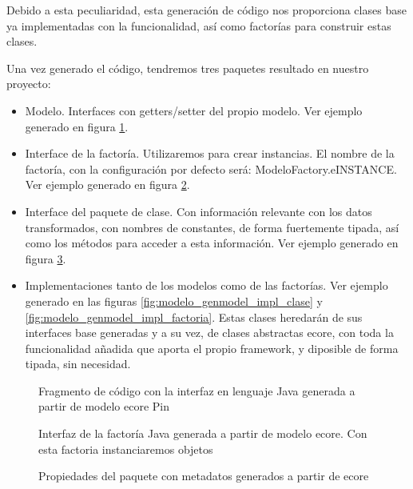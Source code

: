 Debido a esta peculiaridad, esta generación de código nos proporciona clases base ya implementadas con la funcionalidad, así como factorías para construir estas clases.

Una vez generado el código, tendremos tres paquetes resultado en nuestro proyecto:

\begin{itemize}

\item Modelo. Interfaces con getters/setter del propio modelo. Ver ejemplo generado en figura \ref{fig:modelo_genmodel_gen_interface}.

\item Interface de la factoría. Utilizaremos para crear instancias. El nombre de la factoría, con la configuración por defecto será: ModeloFactory.eINSTANCE. Ver ejemplo generado en figura \ref{fig:modelo_genmodel_gen_factoria}. 

\item Interface del paquete de clase. Con información relevante con los datos transformados, con nombres de constantes, de forma fuertemente tipada, así como los métodos para acceder a esta información. Ver ejemplo generado en figura \ref{fig:modelo_genmodel_gen_paquete}.

\item Implementaciones tanto de los modelos como de las factorías. Ver ejemplo generado en las figuras \ref{fig:modelo_genmodel_impl_clase} y  \ref{fig:modelo_genmodel_impl_factoria}. Estas clases heredarán de sus interfaces base generadas y a su vez, de clases abstractas \gls{ecore}, con toda la funcionalidad añadida que aporta el propio framework, y diposible de forma tipada, sin necesidad.

\end{itemize}


\begin{figure}
	\centering
	
	
    
    \sourcepropia{}
    \caption{Fragmento de código con la interfaz en lenguaje Java generada a partir de modelo \gls{ecore} Pin}
    \label{fig:modelo_genmodel_gen_interface}
\end{figure}
\begin{figure}
	\centering
	
	
	
    \sourcepropia{}
    \caption{Interfaz de la factoría Java generada a partir de modelo \gls{ecore}. Con esta factoria instanciaremos objetos}
    \label{fig:modelo_genmodel_gen_factoria}
\end{figure}
\begin{figure}
	\centering
	
	
    
    \sourcepropia{}
    \caption{Propiedades del paquete con metadatos generados a partir de \gls{ecore}}
    \label{fig:modelo_genmodel_gen_paquete}
\end{figure}



